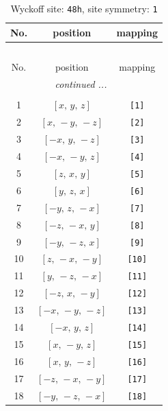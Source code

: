 \documentclass[fleqn,8pt]{jsarticle}
\begin{document}
\renewcommand{\arraystretch}{1.2}
\begin{longtable}{ccc}
\caption{Wyckoff site: {\tt 48h}, site symmetry: {\tt 1}}
 \\
 \hline \hline
No. & position & mapping \\ \hline \endfirsthead

\multicolumn{2}{l}{\tablename\ \thetable{}} \\
 \hline \hline
No. & position & mapping \\ \hline \endhead

 \hline \hline
\multicolumn{2}{r}{\footnotesize\it continued ...} \\ \endfoot

 \hline \hline
\multicolumn{2}{r}{} \\ \endlastfoot

1 & $\left[ x,\, y,\, z \right]$ & {\tt [1]} \\ \hline
2 & $\left[ x,\, - y,\, - z \right]$ & {\tt [2]} \\ \hline
3 & $\left[ - x,\, y,\, - z \right]$ & {\tt [3]} \\ \hline
4 & $\left[ - x,\, - y,\, z \right]$ & {\tt [4]} \\ \hline
5 & $\left[ z,\, x,\, y \right]$ & {\tt [5]} \\ \hline
6 & $\left[ y,\, z,\, x \right]$ & {\tt [6]} \\ \hline
7 & $\left[ - y,\, z,\, - x \right]$ & {\tt [7]} \\ \hline
8 & $\left[ - z,\, - x,\, y \right]$ & {\tt [8]} \\ \hline
9 & $\left[ - y,\, - z,\, x \right]$ & {\tt [9]} \\ \hline
10 & $\left[ z,\, - x,\, - y \right]$ & {\tt [10]} \\ \hline
11 & $\left[ y,\, - z,\, - x \right]$ & {\tt [11]} \\ \hline
12 & $\left[ - z,\, x,\, - y \right]$ & {\tt [12]} \\ \hline
13 & $\left[ - x,\, - y,\, - z \right]$ & {\tt [13]} \\ \hline
14 & $\left[ - x,\, y,\, z \right]$ & {\tt [14]} \\ \hline
15 & $\left[ x,\, - y,\, z \right]$ & {\tt [15]} \\ \hline
16 & $\left[ x,\, y,\, - z \right]$ & {\tt [16]} \\ \hline
17 & $\left[ - z,\, - x,\, - y \right]$ & {\tt [17]} \\ \hline
18 & $\left[ - y,\, - z,\, - x \right]$ & {\tt [18]} \\ \hline

\end{longtable}
\end{document}
